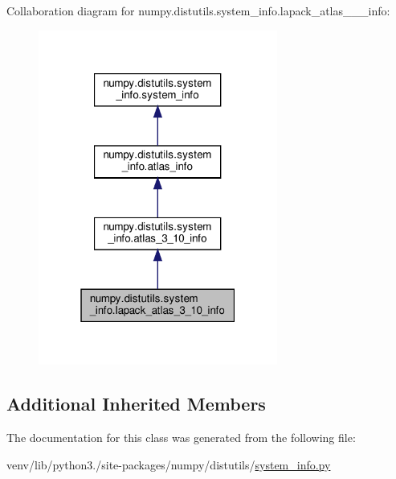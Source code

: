 Collaboration diagram for numpy.\+distutils.\+system\+\_\+info.\+lapack\+\_\+atlas\+\_\+\_\+\_\+info\+:
\nopagebreak
\begin{figure}[H]
\begin{center}
\leavevmode
\includegraphics[width=223pt]{classnumpy_1_1distutils_1_1system__info_1_1lapack__atlas__3__10__info__coll__graph}
\end{center}
\end{figure}
\subsection*{Additional Inherited Members}


The documentation for this class was generated from the following file\+:\begin{DoxyCompactItemize}
\item 
venv/lib/python3./site-\/packages/numpy/distutils/\hyperlink{system__info_8py}{system\+\_\+info.\+py}\end{DoxyCompactItemize}
